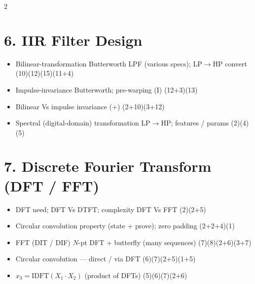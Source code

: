 \documentclass[10pt]{article}
\begin{document}
\begin{multicols}{2}
\section*{6. IIR Filter Design}
\begin{itemize}
  \item Bilinear-transformation Butterworth LPF (various specs); LP$\to$HP convert \hfill (10)(12)(15)(11+4)
  \item Impulse-invariance Butterworth; pre-warping (I) \hfill (12+3)(13)
  \item Bilinear Vs impulse invariance (+) \hfill (2+10)(3+12)
  \item Spectral (digital-domain) transformation LP$\to$HP; features / params \hfill (2)(4)(5)
\end{itemize}

\section*{7. Discrete Fourier Transform (DFT / FFT)}
\begin{itemize}
  \item DFT need; DFT Vs DTFT; complexity DFT Vs FFT \hfill (2)(2+5)
  \item Circular convolution property (state + prove); zero padding \hfill (2+2+4)(1)
  \item FFT (DIT / DIF) $N$-pt DFT + butterfly (many sequences) \hfill (7)(8)(2+6)(3+7)
  \item Circular convolution --- direct / via DFT \hfill (6)(7)(2+5)(1+5)
  \item $x_3=\mathrm{IDFT}(X_1{\cdot}X_2)$ (product of DFTs) \hfill (5)(6)(7)(2+6)
\end{itemize}

\end{multicols}
\end{document}
